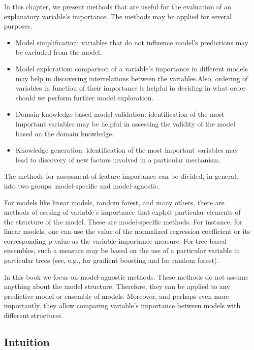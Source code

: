 \documentclass[12pt,]{krantz}
\providecommand{\tightlist}{%
  \setlength{\itemsep}{0pt}\setlength{\parskip}{0pt}}
\begin{document}
In this chapter, we present methods that are useful for the evaluation of an explanatory variable's importance. The methods may be applied for several purposes.

\begin{itemize}
\tightlist
\item
  Model simplification: variables that do not influence model's predictions may be excluded from the model.
\item
  Model exploration: comparison of a variable's importance in different models may help in discovering interrelations between the variables.Also, ordering of variables in function of their importance is helpful in deciding in what order should we perform further model exploration.
\item
  Domain-knowledge-based model validation: identification of the most important variables may be helpful in assessing the validity of the model based on the domain knowledge.
\item
  Knowledge generation: identification of the most important variables may lead to discovery of new factors involved in a particular mechanism.
\end{itemize}

The methods for assessment of feature importance can be divided, in general, into two groups: model-specific and model-agnostic.

For models like linear models, random forest, and many others, there are methods of asssing of variable's importance that exploit particular elements of the structure of the model. These are model-specific methods. For instance, for linear models, one can use the value of the normalized regression coefficient or its corresponding p-value as the variable-importance measure. For tree-based ensembles, such a measure may be based on the use of a particular variable in particular trees (see, e.g., \citep{xgboostExplainer} for gradient boosting and \citep{randomForestExplainer} for random forest).

In this book we focus on model-agnostic methods. These methods do not assume anything about the model structure. Therefore, they can be applied to any predictive model or ensemble of models. Moreover, and perhaps even more importantly, they allow comparing variable's importance between models with different structures.

\hypertarget{featureImportanceIntuition}{%
\subsection{Intuition}\label{featureImportanceIntuition}}
\end{document}
